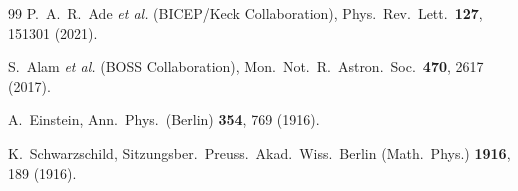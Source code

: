 \documentclass[aps,prd,twocolumn,superscriptaddress,nofootinbib,longbibliography]{revtex4-2}
\begin{document}
\begin{thebibliography}{99}
P.~A.~R.~Ade \textit{et al.} (BICEP/Keck Collaboration),
Phys.\ Rev.\ Lett.\ \textbf{127}, 151301 (2021).


S.~Alam \textit{et al.} (BOSS Collaboration),
Mon.\ Not.\ R.\ Astron.\ Soc.\ \textbf{470}, 2617 (2017).


A.~Einstein,
Ann.\ Phys.\ (Berlin) \textbf{354}, 769 (1916).

K.~Schwarzschild,
Sitzungsber.\ Preuss.\ Akad.\ Wiss.\ Berlin (Math.\ Phys.)
\textbf{1916}, 189 (1916).

\end{thebibliography}
\end{document}
